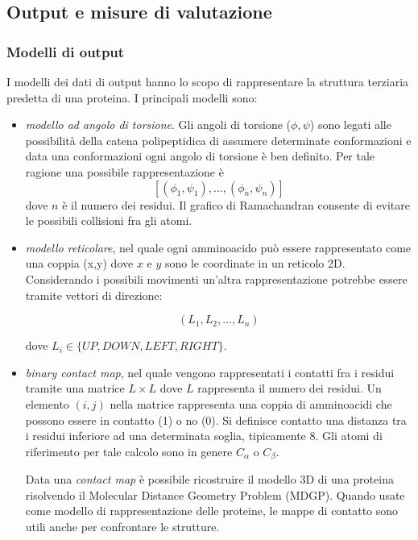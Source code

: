 \subsection{Output e misure di valutazione} \label{sec:modelli-output}

\subsubsection{Modelli di output}
I modelli dei dati di output hanno lo scopo di rappresentare la struttura terziaria predetta di una proteina. I principali modelli sono\supercite{marquez2015soft}:

\begin{itemize}
	\item \textit{modello ad angolo di torsione}. Gli angoli di torsione ($\phi, \psi$) sono legati alle possibilità della catena polipeptidica di assumere determinate conformazioni e data una conformazioni ogni angolo di torsione è ben definito. Per tale ragione una possibile rappresentazione è
	\[ [(\phi_{1}, \psi_{1}), ..., (\phi_{n}, \psi_{n})] \]
	dove $n$ è il numero dei residui. Il grafico di Ramachandran consente di evitare le possibili collisioni fra gli atomi. \\
	
	\item \textit{modello reticolare}, nel quale ogni amminoacido può essere rappresentato come una coppia (x,y) dove $x$ e $y$ sono le coordinate in un reticolo 2D. Considerando i possibili movimenti un'altra rappresentazione potrebbe essere tramite vettori di direzione:
	
	\[ (L_{1}, L_{2}, ..., L_{n}) \]
	
	dove $L_{i} \in \{UP,DOWN,LEFT,RIGHT\}$.\\
	
	\item \textit{binary contact map}, nel quale vengono rappresentati i contatti fra i residui tramite una matrice $L\times L$ dove $L$ rappresenta il numero dei residui. Un elemento $(i,j)$ nella matrice rappresenta una coppia di amminoacidi che possono essere in contatto (1) o no (0). Si definisce contatto una distanza tra i residui inferiore ad una determinata soglia, tipicamente 8\angstrom. Gli atomi di riferimento per tale calcolo sono in genere $C_{\alpha}$ o $C_{\beta}$.
	
	\par Data una \textit{contact map} è possibile ricostruire il modello 3D di una proteina risolvendo il Molecular Distance Geometry Problem (MDGP). Quando usate come modello di rappresentazione delle proteine, le mappe di contatto sono	utili anche per confrontare le strutture. \\
	

\end{itemize}
